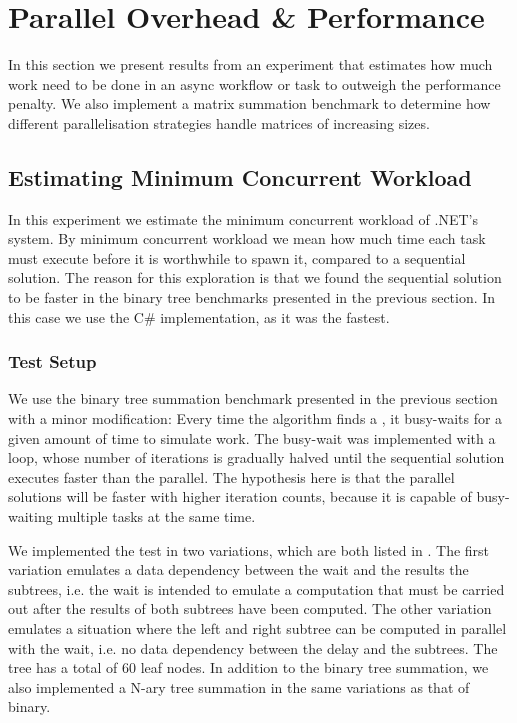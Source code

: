 \section{Parallel Overhead \& Performance}\label{sec:crit:work}
In this section we present results from an experiment that estimates how much work need to be done in an async workflow or task to outweigh the performance penalty. We also implement a matrix summation benchmark to determine how different parallelisation strategies handle matrices of increasing sizes.

\subsection{Estimating Minimum Concurrent Workload}
In this experiment we estimate the minimum concurrent workload of .NET's  system. By minimum concurrent workload we mean how much time each task must execute before it is worthwhile to spawn it, compared to a sequential solution. The reason for this exploration is that we found the sequential solution to be faster in the binary tree benchmarks presented in the previous section. In this case we use the C\# implementation, as it was the fastest.

\subsubsection{Test Setup}
We use the binary tree summation benchmark presented in the previous section with a minor modification: Every time the algorithm finds a , it busy-waits for a given amount of time to simulate work. The busy-wait was implemented with a loop, whose number of iterations is gradually halved until the sequential solution executes faster than the parallel. The hypothesis here is that the parallel solutions will be faster with higher iteration counts, because it is capable of busy-waiting multiple tasks at the same time.

We implemented the test in two variations, which are both listed in . The first variation emulates a data dependency between the wait and the results the subtrees, i.e. the wait is intended to emulate a computation that must be carried out after the results of both subtrees have been computed. The other variation emulates a situation where the left and right subtree can be computed in parallel with the wait, i.e. no data dependency between the delay and the subtrees. The tree has a total of 60 leaf nodes. In addition to the binary tree summation, we also implemented a N-ary tree summation in the same variations as that of binary.


